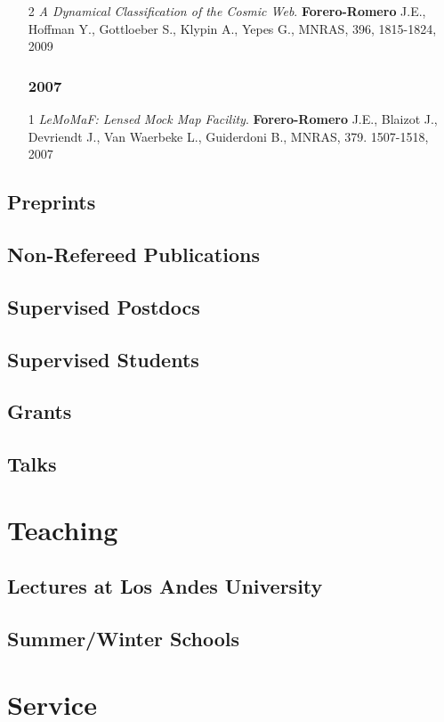 \documentclass[a4paper,10pt]{article} %
\begin{document}
\begin{enumerate}
\item [2]
{\it A Dynamical Classification of the  Cosmic Web}.  {\bf Forero-Romero} J.E., Hoffman Y.,  Gottloeber S., Klypin A., Yepes G.,
MNRAS, 396, 1815-1824, 2009

\subsubsection{2007}
\item [1] 
{\it {\sc LeMoMaF}:  Lensed Mock Map Facility}. 
{\bf Forero-Romero} J.E., Blaizot J., Devriendt J., Van Waerbeke L., Guiderdoni B., 
MNRAS, 379. 1507-1518, 2007
\end{enumerate}

\subsection{Preprints}
\subsection{Non-Refereed Publications}
\subsection{Supervised Postdocs}
\subsection{Supervised Students}
\subsection{Grants}
\subsection{Talks}

\color{red}
\section{Teaching}
\color{black}
\subsection{Lectures at Los Andes University}
\subsection{Summer/Winter Schools}

\color{red}
\section{Service}
\color{black}
\end{document}

